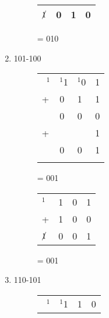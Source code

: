 \begin{enumerate}[label=(\alph*)]
\begin{figure}[H]
\begin{minipage}[t]{0.45\textwidth}
\begin{table}[H]
\begin{tabularx}{0.4\textwidth}{XXXX}
                \hline
                $\cancel{1}$ & 0 & 1 & 0 \\
                \hline
            \end{tabularx}
        \end{table}
        = 010
    \end{minipage}\hfill
\end{figure}
\item 101-100
\begin{figure}[H]
    \begin{minipage}[t]{0.45\textwidth}
        \begin{table}[H]
            \begin{tabularx}{0.4\textwidth}{XXXX}
                \ $^1$&  $^1$1& $^1$0 & 1\\
                + & 0& 1 & 1\\
                \hline
                & 0 & 0 & 0 \\
                + & &  &1\\
                \hline
                & 0 & 0 & 1\\
                \hline
                &  & \\
            \end{tabularx}
        \end{table}
        = 001
    \end{minipage}\hfill
    \begin{minipage}[t]{0.45\textwidth}
        \begin{table}[H]
            \begin{tabularx}{0.4\textwidth}{XXXX}
                $^1$& 1 & 0 & 1\\
                + & 1 & 0 & 0\\
                \hline
                $\cancel{1}$ & 0 & 0 & 1 \\
                \hline
            \end{tabularx}
        \end{table}
        = 001
    \end{minipage}\hfill
\end{figure}
\item 110-101
\begin{figure}[H]
    \begin{minipage}[t]{0.45\textwidth}
        \begin{table}[H]
            \begin{tabularx}{0.4\textwidth}{XXXX}
                \ $^1$&  $^1$1& 1 & 0\\

\end{tabularx}
\end{table}
\end{minipage}
\end{figure}
\end{enumerate}
